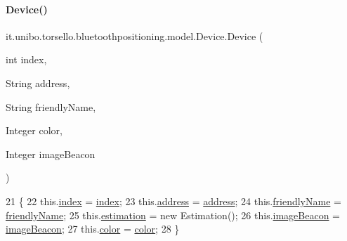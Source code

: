 \paragraph{\texorpdfstring{Device()}{Device()}}
{\footnotesize\ttfamily it.\+unibo.\+torsello.\+bluetoothpositioning.\+model.\+Device.\+Device (\begin{DoxyParamCaption}\item[{int}]{index,  }\item[{String}]{address,  }\item[{String}]{friendly\+Name,  }\item[{Integer}]{color,  }\item[{Integer}]{image\+Beacon }\end{DoxyParamCaption})}


\begin{DoxyCode}
21                                                                                                       \{
22         this.\hyperlink{classit_1_1unibo_1_1torsello_1_1bluetoothpositioning_1_1model_1_1Device_a55a01164b2388451f5e8344bfbc61ccc_a55a01164b2388451f5e8344bfbc61ccc}{index} = \hyperlink{classit_1_1unibo_1_1torsello_1_1bluetoothpositioning_1_1model_1_1Device_a55a01164b2388451f5e8344bfbc61ccc_a55a01164b2388451f5e8344bfbc61ccc}{index};
23         this.\hyperlink{classit_1_1unibo_1_1torsello_1_1bluetoothpositioning_1_1model_1_1Device_a0abcf7e0df4ccc96e487c6f9b90b4e13_a0abcf7e0df4ccc96e487c6f9b90b4e13}{address} = \hyperlink{classit_1_1unibo_1_1torsello_1_1bluetoothpositioning_1_1model_1_1Device_a0abcf7e0df4ccc96e487c6f9b90b4e13_a0abcf7e0df4ccc96e487c6f9b90b4e13}{address};
24         this.\hyperlink{classit_1_1unibo_1_1torsello_1_1bluetoothpositioning_1_1model_1_1Device_aa9a540b316c9de7f9b3a94f58570f6d3_aa9a540b316c9de7f9b3a94f58570f6d3}{friendlyName} = \hyperlink{classit_1_1unibo_1_1torsello_1_1bluetoothpositioning_1_1model_1_1Device_aa9a540b316c9de7f9b3a94f58570f6d3_aa9a540b316c9de7f9b3a94f58570f6d3}{friendlyName};
25         this.\hyperlink{classit_1_1unibo_1_1torsello_1_1bluetoothpositioning_1_1model_1_1Device_ac619c42728cd40f41a5f12fde56b4425_ac619c42728cd40f41a5f12fde56b4425}{estimation} = \textcolor{keyword}{new} Estimation();
26         this.\hyperlink{classit_1_1unibo_1_1torsello_1_1bluetoothpositioning_1_1model_1_1Device_a2faee0d51162a4efebfc2db787901019_a2faee0d51162a4efebfc2db787901019}{imageBeacon} = \hyperlink{classit_1_1unibo_1_1torsello_1_1bluetoothpositioning_1_1model_1_1Device_a2faee0d51162a4efebfc2db787901019_a2faee0d51162a4efebfc2db787901019}{imageBeacon};
27         this.\hyperlink{classit_1_1unibo_1_1torsello_1_1bluetoothpositioning_1_1model_1_1Device_aaba1f93e2a0f88f01262cb38a65489e6_aaba1f93e2a0f88f01262cb38a65489e6}{color} = \hyperlink{classit_1_1unibo_1_1torsello_1_1bluetoothpositioning_1_1model_1_1Device_aaba1f93e2a0f88f01262cb38a65489e6_aaba1f93e2a0f88f01262cb38a65489e6}{color};
28     \}
\end{DoxyCode}


